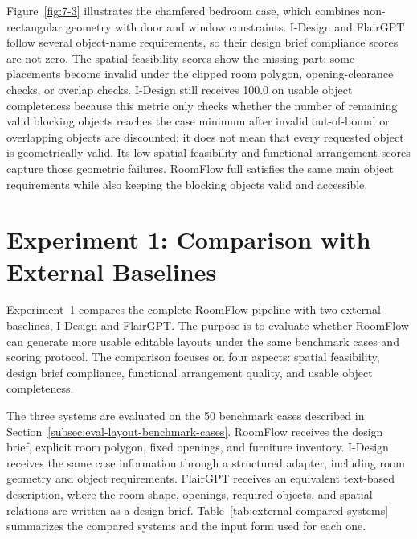 Figure~\ref{fig:7-3} illustrates the chamfered bedroom case, which combines non-rectangular geometry with door and window constraints. I-Design and FlairGPT follow several object-name requirements, so their design brief compliance scores are not zero. The spatial feasibility scores show the missing part: some placements become invalid under the clipped room polygon, opening-clearance checks, or overlap checks. I-Design still receives 100.0 on usable object completeness because this metric only checks whether the number of remaining valid blocking objects reaches the case minimum after invalid out-of-bound or overlapping objects are discounted; it does not mean that every requested object is geometrically valid. Its low spatial feasibility and functional arrangement scores capture those geometric failures. RoomFlow full satisfies the same main object requirements while also keeping the blocking objects valid and accessible.

\section{Experiment 1: Comparison with External Baselines}
\label{subsec:eval-layout-external-baselines}

Experiment~1 compares the complete RoomFlow pipeline with two external baselines, I-Design and FlairGPT. The purpose is to evaluate whether RoomFlow can generate more usable editable layouts under the same benchmark cases and scoring protocol. The comparison focuses on four aspects: spatial feasibility, design brief compliance, functional arrangement quality, and usable object completeness.

The three systems are evaluated on the 50 benchmark cases described in Section~\ref{subsec:eval-layout-benchmark-cases}. RoomFlow receives the design brief, explicit room polygon, fixed openings, and furniture inventory. I-Design receives the same case information through a structured adapter, including room geometry and object requirements. FlairGPT receives an equivalent text-based description, where the room shape, openings, required objects, and spatial relations are written as a design brief. Table~\ref{tab:external-compared-systems} summarizes the compared systems and the input form used for each one.

